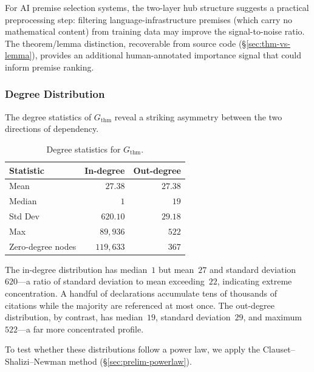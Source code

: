 For AI premise selection systems, the two-layer hub structure suggests a practical preprocessing step: filtering language-infrastructure premises (which carry no mathematical content) from training data may improve the signal-to-noise ratio. The theorem/lemma distinction, recoverable from source code (\S\ref{sec:thm-vs-lemma}), provides an additional human-annotated importance signal that could inform premise ranking.

\subsubsection{Degree Distribution}
\label{sec:thm-degree}

The degree statistics of $G_{\mathrm{thm}}$ reveal a striking asymmetry between the two directions of dependency.

\begin{table}[ht]
\centering
\caption{Degree statistics for $G_{\mathrm{thm}}$.}
\label{tab:thm-degree}
\begin{tabular}{lrr}
\toprule
Statistic & In-degree & Out-degree \\
\midrule
Mean    & $27.38$    & $27.38$ \\
Median  & $1$        & $19$ \\
Std Dev & $620.10$   & $29.18$ \\
Max     & $89{,}936$ & $522$ \\
Zero-degree nodes & $119{,}633$ & $367$ \\
\bottomrule
\end{tabular}
\end{table}

The in-degree distribution has median~$1$ but mean~$27$ and standard deviation~$620$---a ratio of standard deviation to mean exceeding~$22$, indicating extreme concentration. A handful of declarations accumulate tens of thousands of citations while the majority are referenced at most once. The out-degree distribution, by contrast, has median~$19$, standard deviation~$29$, and maximum~$522$---a far more concentrated profile.

To test whether these distributions follow a power law, we apply the Clauset--Shalizi--Newman method (\S\ref{sec:prelim-powerlaw}).

